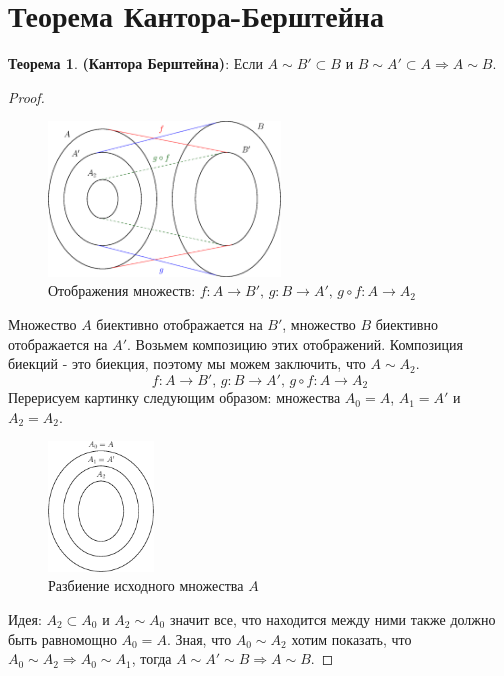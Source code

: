 \documentclass[12pt]{article}
\theoremstyle{definition}
\newtheorem{theorem}{Теорема}
\begin{document}
\section*{Теорема Кантора-Берштейна}

\begin{theorem}
	\textbf{(Кантора Берштейна)}: Если $A \sim B' \subset B$ и $B \sim A' \subset A \Rightarrow A \sim B$.
\end{theorem} 

\begin{proof}
	
\begin{figure}[H]
	\centering
	\includegraphics[width=0.55\textwidth]{5_5.eps}
	\caption{Отображения множеств: $f \colon A \rightarrow B', \, g \colon B \rightarrow A', \, g \circ f \colon A \rightarrow A_2$}
	\label{5_5}
\end{figure}	

Множество $A$ биективно отображается на $B'$, множество $B$ биективно отображается на $A'$. Возьмем композицию этих отображений. Композиция биекций - это биекция, поэтому мы можем заключить, что $A \sim A_2$. 
$$f \colon A \rightarrow B', \, g \colon B \rightarrow A', \, g \circ f \colon A \rightarrow A_2$$
Перерисуем картинку следующим образом: множества $A_0 =A$, $A_1 = A'$ и $A_2 = A_2$. 

\begin{figure}[H]
	\centering
	\includegraphics[width=0.25\textwidth]{5_6.eps}	
	\caption{Разбиение исходного множества $A$} 
	\label{5_6}
\end{figure}		
Идея: $A_2 \subset A_0$ и $A_2 \sim A_0$ значит все, что находится между ними также должно быть равномощно $A_0 = A$. Зная, что $A_0 \sim A_2$ хотим показать, что $A_0 \sim A_2 \Rightarrow A_0 \sim A_1$, тогда $A \sim A' \sim B \Rightarrow A \sim B$.


\end{proof}
\end{document}
